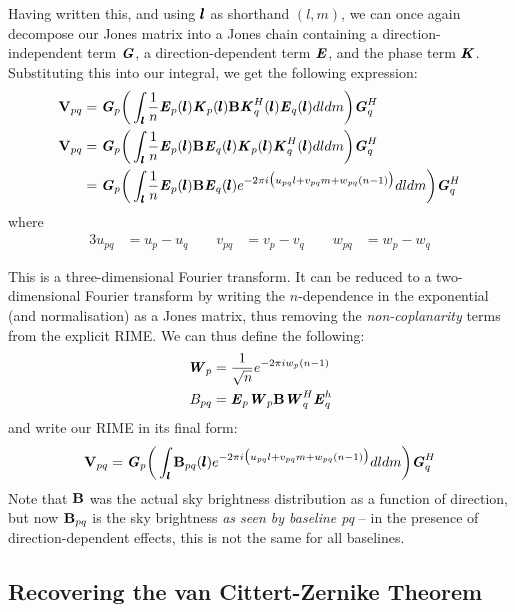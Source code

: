 \pg
Having written this, and using $\pmb{l}$ as shorthand $(l,m)$, we can once again decompose our Jones matrix into a Jones chain containing a direction-independent term $\textbf{\emph{G}}$, a direction-dependent term $\textbf{\emph{E}}$, and the phase term $\textbf{\emph{K}}$. Substituting this into our integral, we get the following expression:
\begin{align}
\textbf{V}_{pq} &= \textbf{\emph{G}}_p \bigg(\int_{\pmb{l}} \frac{1}{n} \textbf{\emph{E}}_p(\pmb{l}) \textbf{\emph{K}}_p(\pmb{l}) \textbf{B} \textbf{\emph{K}}_q^H(\pmb{l}) \textbf{\emph{E}}_q(\pmb{l})  dl dm \bigg) \textbf{\emph{G}}_q^H\\\textbf{V}_{pq} &= \textbf{\emph{G}}_p \bigg(\int_{\pmb{l}} \frac{1}{n} \textbf{\emph{E}}_p(\pmb{l}) \textbf{B} \textbf{\emph{E}}_q(\pmb{l}) \textbf{\emph{K}}_p(\pmb{l})\textbf{\emph{K}}_q^H(\pmb{l}) dl dm \bigg) \textbf{\emph{G}}_q^H\\
          &= \textbf{\emph{G}}_p \bigg(\int_{\pmb{l}} \frac{1}{n} \textbf{\emph{E}}_p(\pmb{l}) \textbf{B} \textbf{\emph{E}}_q(\pmb{l}) e^{-2\pi i\big(u_{pq}l+v_{pq}m+w_{pq}(n-1)\big)} dl dm \bigg) \textbf{\emph{G}}_q^H
\end{align}
where
\begin{alignat}{3}
u_{pq}&=u_p-u_q \qquad v_{pq}&=v_p-v_q \qquad w_{pq}&=w_p-w_q
\end{alignat}

\pg
This is a three-dimensional Fourier transform. It can be reduced to a two-dimensional Fourier transform by writing the $n$-dependence in the exponential (and normalisation) as a Jones matrix, thus removing the \emph{non-coplanarity} terms from the explicit RIME. We can thus define the following:
\begin{align}
\textbf{\emph{W}}_p &= \frac{1}{\sqrt{n}}e^{-2\pi i w_p(n-1)}\\
B_{pq}    &= \textbf{\emph{E}}_p \textbf{\emph{W}}_p \textbf{B} \textbf{\emph{W}}_q^H \textbf{\emph{E}}_q^h
\end{align}
and write our RIME in its final form:
\begin{equation}\label{eq.vis.FT.coherency.matrix}
\textbf{V}_{pq} = \textbf{\emph{G}}_p \bigg(\int_{\pmb{l}} \textbf{B}_{pq}(\pmb{l}) e^{-2\pi i\big(u_{pq}l+v_{pq}m+w_{pq}(n-1)\big)} dl dm \bigg) \textbf{\emph{G}}_q^H
\end{equation}
\pg
Note that $\textbf{B}$ was the actual sky  brightness distribution as a function of direction, but now $\textbf{B}_{pq}$ is the sky brightness \emph{as seen by baseline pq} -- in the presence of direction-dependent effects, this is not the same for all baselines.\\

\subsection{Recovering the van Cittert-Zernike Theorem}
\label{section.RIME.FullSky.CVZ}

